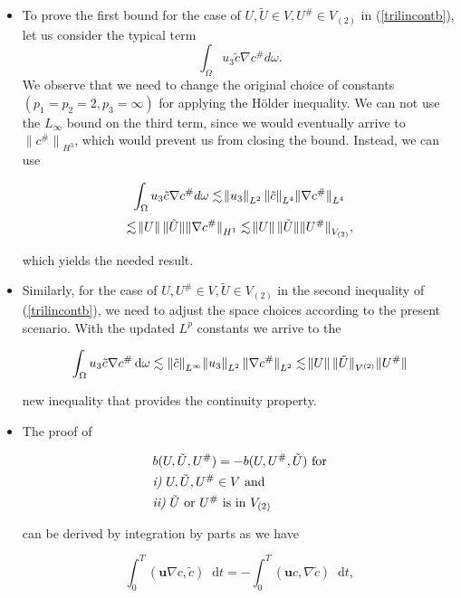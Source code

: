 \documentclass[12pt]{report}
\numberwithin{theorem}{chapter}
\numberwithin{corollary}{chapter}
\numberwithin{lemma}{chapter}
\numberwithin{remark}{chapter}
\numberwithin{definition}{chapter}
\numberwithin{prop}{chapter}
\newcommand*\diff{\mathop{}\!\mathrm{d}}
\begin{document}
\begin{itemize}

  \item To prove the first bound for the case of $U, \tilde{U} \in V, U^\# \in V_{(2)}$ in (\ref{trilincontb}), let us consider the typical term $$ \int_\Omega u_3 \tilde{c} \nabla c^\# d \omega.$$ We observe that we need to change the original choice of constants $(p_1 = p_2 = 2, p_3 = \infty)$ for applying the H\"older inequality. We can not use the $L_\infty$ bound on the third term, since we would eventually arrive to ${ \| c^\# \|}_{H^3}$, which would prevent us from closing the bound. Instead, we can use
  
  \[ \int_\Omega u_3 \tilde{c} \nabla c^\# d \omega \lesssim \norm{u_3}_{L^2} {\| \tilde{c} \|}_{L^4} {\| \nabla c^\# \|}_{L^4} \]
  \[ \lesssim \norm{U} \|\tilde{U} \| {\|\nabla c^\# \|}_{H^1} \lesssim \norm{U}  \|\tilde{U} \| {\| U^\# \|}_{V_{(2)}}, \]
  
  which yields the needed result.
  
  \item Similarly, for the case of $U, U^\#  \in V, \tilde{U} \in V_{(2)}$ in the second inequality of (\ref{trilincontb}), we need to adjust the space choices according to the present scenario. With the updated $L^p$ constants we arrive to the
  
  \[ \int_\Omega u_3 \tilde{c} \nabla c^\# \diff \omega \lesssim {\| \tilde{c} \|}_{L^\infty} \norm{ u_3}_{L^2} {\| \nabla c^\# \|}_{L^2}  \lesssim \norm{U} { \| \tilde{U} \| }_{V^{(2)}} \| U^\# \| \]
  
  new inequality that provides the continuity property.
  
  \item The proof of
  
  \begin{equation}
    \begin{split}
    & b(U, \tilde{U}, U^\# ) = - b(U, U^\#, \tilde{U} ) \text{ for} \\
    & \text{\textit{i)} } U, \tilde{U}, U^\# \in V \text{ and} \\
    & \text{\textit{ii)} } \tilde{U} \text{ or } U^\# \text{ is in } V_{(2)}
    \end{split}
  \end{equation}
    
  can be derived by integration by parts as we have
  
  \[ \int_0 ^T  (\mathbf{u} \nabla c, \tilde{c}) \diff t =  - \int_0 ^T  ( \mathbf{u} c, \nabla \tilde{c}) \diff t, \]
  

\end{itemize}
\end{document}

